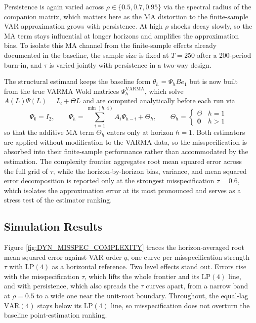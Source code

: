 Persistence is again varied across $\rho \in \{0.5, 0.7, 0.95\}$ via the spectral radius of the 
companion matrix, which matters here as the MA distortion to the finite-sample VAR 
approximation grows with persistence. At high $\rho$ shocks decay slowly, so the MA term stays 
influential at longer horizons and amplifies the approximation bias. To isolate this MA channel 
from the finite-sample effects already documented in the baseline, the sample size is fixed at 
$T = 250$ after a 200-period burn-in, and $\tau$ is varied jointly with persistence in a two-way 
design.


The structural estimand keeps the baseline form $\theta_h = \Psi_h B e_1$ but is now built from 
the true VARMA Wold matrices $\Psi_h^{\mathrm{VARMA}}$, which solve $A(L)\Psi(L) = I_2 + \Theta L$ 
and are computed analytically before each run via
\begin{equation}
    \Psi_0 = I_2, \qquad 
    \Psi_h = \sum_{i=1}^{\min(h,4)} A_i \Psi_{h-i} + \Theta_h, 
    \qquad \Theta_h = \begin{cases} \Theta & h = 1 \\ \mathbf{0} & h > 1 \end{cases}
\end{equation}
so that the additive MA term $\Theta_h$ enters only at horizon $h = 1$. Both estimators are applied without modification to the VARMA data, so the misspecification is absorbed into their finite-sample performance rather than accommodated by the estimation. The complexity frontier aggregates root mean squared error across the full grid of $\tau$, while the horizon-by-horizon  bias, variance, and mean squared error decomposition is reported only at the strongest misspecification $\tau = 0.6$, which isolates the approximation error at its most pronounced and serves as a stress test of the estimator ranking.

\FloatBarrier

\subsection{Simulation Results}

Figure \ref{fig:DYN_MISSPEC_COMPLEXITY} traces the horizon-averaged root mean squared error 
against VAR order $q$, one curve per misspecification strength $\tau$ with $\text{LP}(4)$ as a 
horizontal reference. Two level effects stand out. Errors rise with the misspecification $\tau$, 
which lifts the whole frontier and its $\text{LP}(4)$ line, and with persistence, which also 
spreads the $\tau$ curves apart, from a narrow band at $\rho=0.5$ to a wide one near the 
unit-root boundary. Throughout, the equal-lag $\text{VAR}(4)$ stays below its $\text{LP}(4)$ 
line, so misspecification does not overturn the baseline point-estimation ranking.

